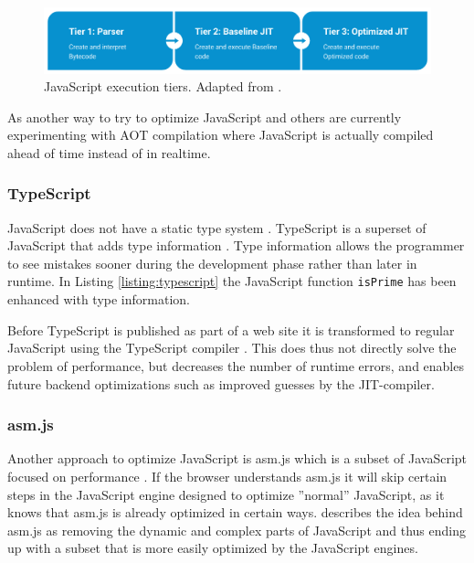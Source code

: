 \begin{figure}[!h]
\centering
\includegraphics[width=16cm,keepaspectratio]{figures/javascript-optimization}
\caption{JavaScript execution tiers. Adapted from \textcite{ParkKimMoon2017,ZhuykovVardanyanMelnikBuchatskiySharygin2015}.}
\label{javascript-optimization}
\end{figure}        

As another way to try to optimize JavaScript \textcite{ParkJungMoon2015,ZhuykovVardanyanMelnikBuchatskiySharygin2015} and others are currently experimenting with AOT compilation where JavaScript is actually compiled ahead of time instead of in realtime.

\subsubsection{TypeScript}

JavaScript does not have a static type system \parencite{Park2014}. TypeScript is a superset of JavaScript that adds type information \parencite{DeWolffHage2017}. Type information allows the programmer to see mistakes sooner during the development phase rather than later in runtime. In Listing \ref{listing:typescript} the JavaScript function \texttt{isPrime} has been enhanced with type information.



Before TypeScript is published as part of a web site it is transformed to regular JavaScript using the TypeScript compiler \parencite{ReiserBlaser2017}. This does thus not directly solve the problem of performance, but decreases the number of runtime errors, and enables future backend optimizations such as improved guesses by the JIT-compiler.

\subsubsection{asm.js}

Another approach to optimize JavaScript is asm.js which is a subset of JavaScript focused on performance \parencite{Zakai2018}. If the browser understands asm.js it will skip certain steps in the JavaScript engine designed to optimize ''normal'' JavaScript, as it knows that asm.js is already optimized in certain ways. \textcite{Zakai2018} describes the idea behind asm.js as removing the dynamic and complex parts of JavaScript and thus ending up with a subset that is more easily optimized by the JavaScript engines.

